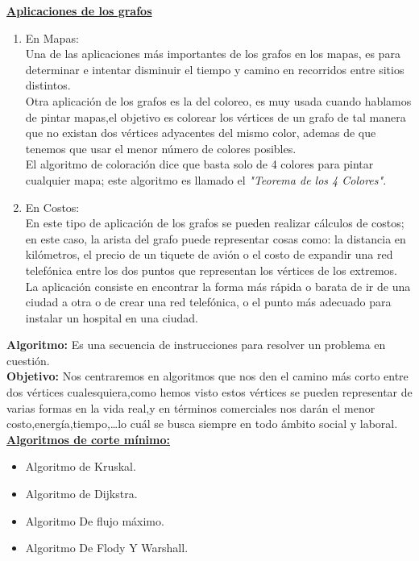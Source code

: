 \documentclass[a4,papper]{IEEEtran}
\begin{document}
\newpage
{\noindent \large \bf \underline {Aplicaciones de los grafos}}\\
\begin{enumerate}
    \item En Mapas:\\
     Una de las aplicaciones más importantes de los grafos en los mapas, es para determinar e intentar disminuir el tiempo y camino en recorridos entre sitios distintos.\\
     Otra aplicación de los grafos es la del coloreo, es muy usada cuando hablamos de pintar mapas,el objetivo es colorear los vértices de un grafo de tal manera que no existan dos vértices adyacentes del mismo color, ademas de que tenemos que usar el menor número de colores posibles.\\
    El algoritmo de coloración dice que basta solo de 4 colores para pintar cualquier mapa; este algoritmo es llamado el {\emph{"Teorema de los 4 Colores"}}.
    \item En Costos:\\
    En este tipo de aplicación de los grafos se pueden realizar cálculos de costos; en este caso, la arista del grafo puede representar cosas como: la distancia en kilómetros, el precio de un tiquete de avión o el costo de expandir una red telefónica entre los dos puntos que representan los vértices de los extremos.\\
    La aplicación consiste en encontrar la forma más rápida o barata de ir de una ciudad a otra o de crear una red telefónica, o el punto más adecuado para instalar un hospital en una ciudad.\\

\end{enumerate}
{\noindent \large \bf {Algoritmo:}}
Es una secuencia de instrucciones para resolver un problema en cuestión.\\
{\noindent \large \bf {Objetivo:}}
 Nos centraremos en algoritmos que nos den el camino más corto entre dos vértices cualesquiera,como hemos visto estos vértices se pueden representar de varias formas en la vida real,y en términos comerciales nos darán el menor costo,energía,tiempo,\ldots lo cuál se busca siempre en todo ámbito social y laboral.\\
{\noindent \large \bf \underline {Algoritmos de corte mínimo:}}\\

\begin{itemize}[]
    \item Algoritmo de Kruskal.
    \item Algoritmo de Dijkstra.
    \item Algoritmo De flujo máximo.
    \item Algoritmo De Flody Y Warshall.
\end{itemize}
\end{document}
